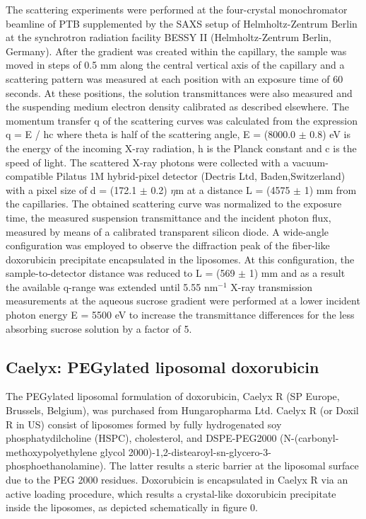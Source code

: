 The scattering experiments were performed at the four-crystal monochromator beamline of PTB supplemented by the SAXS setup of Helmholtz-Zentrum Berlin at the synchrotron radiation facility BESSY II (Helmholtz-Zentrum Berlin, Germany). After the gradient was created within the capillary, the sample was moved in steps of 0.5 mm along the central vertical axis of the capillary and a scattering pattern was measured at each position with an exposure time of 60 seconds. At these positions, the solution transmittances were also measured and the suspending medium electron density calibrated as described elsewhere. The momentum transfer q of the scattering curves was calculated from the expression q = E / hc where theta is half of the scattering angle, E = (8000.0 $\pm$ 0.8) eV is the energy of the incoming X-ray radiation, h is the Planck constant and c is the speed of light. The scattered X-ray photons were collected with a vacuum-compatible Pilatus 1M hybrid-pixel detector (Dectris Ltd, Baden,Switzerland) with a pixel size of d = (172.1 $\pm$ 0.2) $\eta$m at a distance L = (4575 $\pm$ 1) mm from the capillaries. The obtained scattering curve was normalized to the exposure time, the measured suspension transmittance and the incident photon flux, measured by means of a calibrated transparent silicon diode. A wide-angle configuration was employed to observe the diffraction peak of the fiber-like doxorubicin precipitate encapsulated in the liposomes. At this configuration, the sample-to-detector distance was reduced to L = (569 $\pm$ 1) mm and as a result the available q-range was extended until 5.55 nm$^{-1}$ X-ray transmission measurements at the aqueous sucrose gradient were performed at a lower incident photon energy E = 5500 eV to increase the transmittance differences for the less absorbing sucrose solution by a factor of 5.


\subsection{Caelyx: PEGylated liposomal doxorubicin}
The PEGylated liposomal formulation of doxorubicin, Caelyx R (SP Europe, Brussels, Belgium), was purchased from Hungaropharma Ltd. Caelyx R (or Doxil R in US) consist of liposomes formed by fully hydrogenated soy phosphatydilcholine (HSPC), cholesterol, and DSPE-PEG2000 (N-(carbonyl-methoxypolyethylene glycol 2000)-1,2-distearoyl-sn-glycero-3-phosphoethanolamine). The latter results a steric barrier at the liposomal surface due to the PEG 2000 residues. Doxorubicin is encapsulated in Caelyx R via an active loading procedure, which results a crystal-like doxorubicin precipitate inside the liposomes, as depicted schematically in figure 0. 

